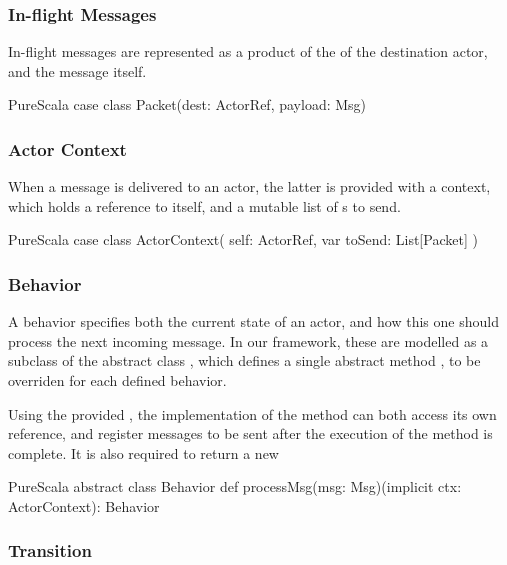 \subsubsection{In-flight Messages}

In-flight messages are represented as a product of the \ActorRef of the destination actor,
and the message itself.

\begin{ShortCode}{PureScala}
case class Packet(dest: ActorRef, payload: Msg)
\end{ShortCode}

\subsubsection{Actor Context}

When a message is delivered to an actor, the latter is provided with a context,
which holds a reference to itself, and a mutable list of s to send.

\begin{ShortCode}{PureScala}
case class ActorContext(
  self: ActorRef,
  var toSend: List[Packet]
)
\end{ShortCode}

\subsubsection{Behavior}

A behavior specifies both the current state of an actor, and how this one should 
process the next incoming message. In our framework, these are modelled as a subclass 
of the abstract class , which defines a single abstract method 
, to be overriden for each defined behavior.

Using the provided , the implementation of the 
method can both access its own reference, and register messages to be sent after the
execution of the method is complete. It is also required to return a new 

\begin{ShortCode}{PureScala}
abstract class Behavior {
  def processMsg(msg: Msg)(implicit ctx: ActorContext): Behavior
}
\end{ShortCode}

\subsubsection{Transition}

